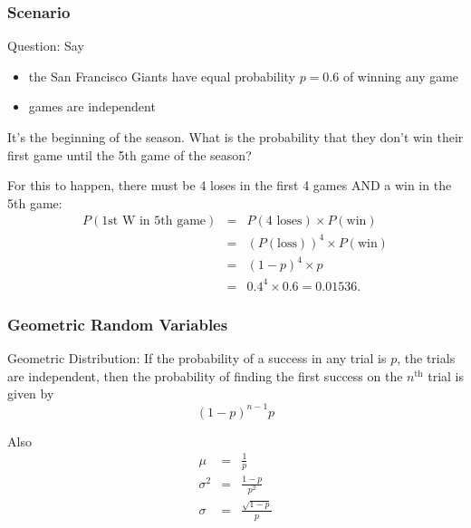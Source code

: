\documentclass[handout]{beamer}
\newcommand{\blue}[1]{\textcolor{blue2}{#1}}
\begin{document}
\begin{frame}[fragile]
\frametitle{Scenario}

\blue{Question}:  Say
\begin{itemize}
\item the San Francisco Giants have equal probability $p=0.6$ of winning any game
\item games are independent
\end{itemize}

It's the beginning of the season.  What is the probability that they don't win their first game until the 5th game of the season?

\vspace{0.5cm}

\pause For this to happen, there must be 4 loses in the first 4 games AND a win in the 5th game:
\begin{eqnarray*}
P(\mbox{1st W in 5th game}) &=& P(\mbox{4 loses}) \times P(\mbox{win})\\
&=& (P(\mbox{loss}))^4 \times P(\mbox{win})\\
&=& (1-p)^4 \times p\\
&=& 0.4^4 \times 0.6 = 0.01536.
\end{eqnarray*}


\end{frame}


\begin{frame}[fragile]
\frametitle{Geometric Random Variables}

\blue{Geometric Distribution}: If the probability of a success in any trial is $p$, the trials are independent,
then the probability of finding the first success on the $n^{\mbox{th}}$ trial is given by
\[
(1-p)^{n-1}p
\]

\pause Also
\begin{eqnarray*}
\mu &=& \frac{1}{p}\\
\sigma^2 &=& \frac{1-p}{p^2}\\
\sigma &=& \frac{\sqrt{1-p}}{p}
\end{eqnarray*}


\end{frame}
\end{document}
